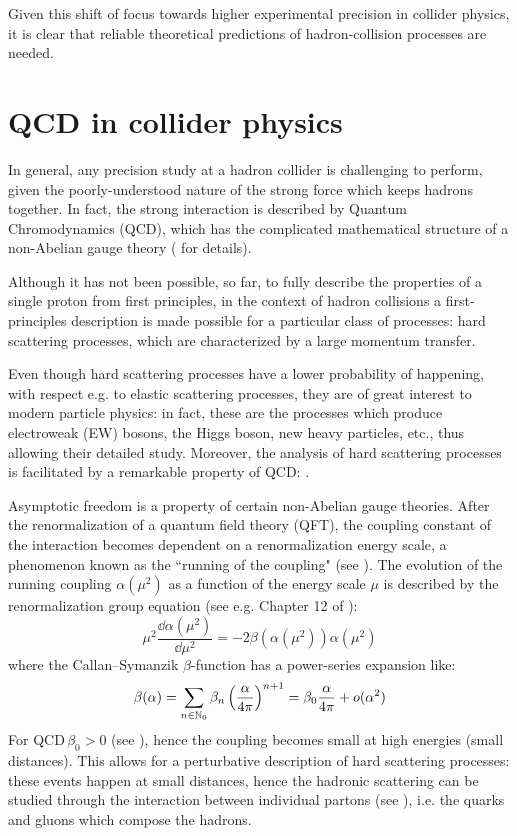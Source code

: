 Given this shift of focus towards higher experimental precision in collider physics, it is clear that reliable theoretical predictions of hadron-collision processes are needed.

\section{QCD in collider physics}
\label{sec:coll-phys}

In general, any precision study at a hadron collider is challenging to perform, given the poorly-understood nature of the strong force which keeps hadrons together. In fact, the strong interaction is described by Quantum Chromodynamics (QCD), which has the complicated mathematical structure of a non-Abelian gauge theory ( for details).

Although it has not been possible, so far, to fully describe the properties of a single proton from first principles, in the context of hadron collisions a first-principles description is made possible for a particular class of processes: hard scattering processes, which are characterized by a large momentum transfer.

Even though hard scattering processes have a lower probability of happening, with respect e.g. to elastic scattering processes, they are of great interest to modern particle physics: in fact, these are the processes which produce electroweak (EW) bosons, the Higgs boson, new heavy particles, etc., thus allowing their detailed study. Moreover, the analysis of hard scattering processes is facilitated by a remarkable property of QCD: .

Asymptotic freedom is a property of certain non-Abelian gauge theories. After the renormalization of a quantum field theory (QFT), the coupling constant of the interaction becomes dependent on a renormalization energy scale, a phenomenon known as the ``running of the coupling" (see ). The evolution of the running coupling $ \alpha(\mu^2) $ as a function of the energy scale $ \mu $ is described by the renormalization group equation (see e.g. Chapter 12 of \cite{Peskin-1995}):
\begin{equation}
  \mu^2 \frac{\dd \alpha(\mu^2)}{\dd \mu^2} = - 2 \beta(\alpha(\mu^2)) \alpha(\mu^2)
  \label{eq:ren-gr}
\end{equation}
where the Callan--Symanzik $ \beta $-function has a power-series expansion like:
\begin{equation}
  \beta(\alpha) = \sum_{n \in \mathbb{N}_0} \beta_n \left( \frac{\alpha}{4\pi} \right)^{n+1} = \beta_0 \frac{\alpha}{4\pi} + o(\alpha^2)
  \label{eq:beta-func}
\end{equation}
For QCD\footnotemark $ \,\beta_0 > 0 $ (see \cite{Gross-1973, Politzer-1973}), hence the coupling becomes small at high energies (small distances). This allows for a perturbative description of hard scattering processes: these events happen at small distances, hence the hadronic scattering can be studied through the interaction between individual partons (see ), i.e. the quarks and gluons which compose the hadrons.

